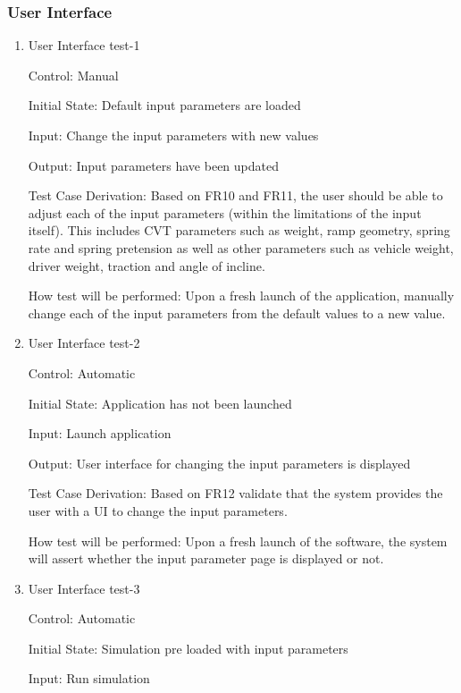 \documentclass[12pt, titlepage]{article}
\begin{document}
\subsubsection{User Interface}

\begin{enumerate}
  \item{User Interface test-1\\}
  
  Control: Manual

  Initial State: Default input parameters are loaded
            
  Input: Change the input parameters with new values
            
  Output: Input parameters have been updated 
  
  Test Case Derivation: Based on FR10 and FR11, the user should be able to adjust each of the input parameters (within the limitations of the input itself).
  This includes CVT parameters such as weight, ramp geometry, spring rate and spring pretension as well as other parameters such as vehicle weight, driver weight, traction and angle of incline. 
  
  How test will be performed: Upon a fresh launch of the application, manually change each of the input parameters from the default values to a new value. 
             
  \item{User Interface test-2\\}
 
  Control: Automatic
            
  Initial State: Application has not been launched
            
  Input: Launch application
            
  Output: User interface for changing the input parameters is displayed
  
  Test Case Derivation: Based on FR12 validate that the system provides the user with a UI to change the input parameters.
  
  How test will be performed: Upon a fresh launch of the software, the system will assert whether the input parameter page is displayed or not. 
  \item {User Interface test-3\\}
  
  Control: Automatic
            
  Initial State: Simulation pre loaded with input parameters
            
  Input: Run simulation 
            

\end{enumerate}
\end{document}
